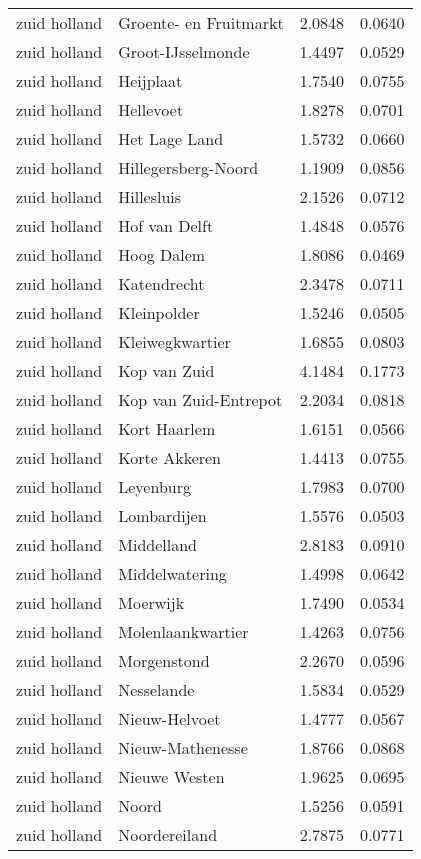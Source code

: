 \begin{longtable}{llcc}
zuid holland & Groente- en Fruitmarkt & 2.0848 & 0.0640 \\
zuid holland & Groot-IJsselmonde & 1.4497 & 0.0529 \\
zuid holland & Heijplaat & 1.7540 & 0.0755 \\
zuid holland & Hellevoet & 1.8278 & 0.0701 \\
zuid holland & Het Lage Land & 1.5732 & 0.0660 \\
zuid holland & Hillegersberg-Noord & 1.1909 & 0.0856 \\
zuid holland & Hillesluis & 2.1526 & 0.0712 \\
zuid holland & Hof van Delft & 1.4848 & 0.0576 \\
zuid holland & Hoog Dalem & 1.8086 & 0.0469 \\
zuid holland & Katendrecht & 2.3478 & 0.0711 \\
zuid holland & Kleinpolder & 1.5246 & 0.0505 \\
zuid holland & Kleiwegkwartier & 1.6855 & 0.0803 \\
zuid holland & Kop van Zuid & 4.1484 & 0.1773 \\
zuid holland & Kop van Zuid-Entrepot & 2.2034 & 0.0818 \\
zuid holland & Kort Haarlem & 1.6151 & 0.0566 \\
zuid holland & Korte Akkeren & 1.4413 & 0.0755 \\
zuid holland & Leyenburg & 1.7983 & 0.0700 \\
zuid holland & Lombardijen & 1.5576 & 0.0503 \\
zuid holland & Middelland & 2.8183 & 0.0910 \\
zuid holland & Middelwatering & 1.4998 & 0.0642 \\
zuid holland & Moerwijk & 1.7490 & 0.0534 \\
zuid holland & Molenlaankwartier & 1.4263 & 0.0756 \\
zuid holland & Morgenstond & 2.2670 & 0.0596 \\
zuid holland & Nesselande & 1.5834 & 0.0529 \\
zuid holland & Nieuw-Helvoet & 1.4777 & 0.0567 \\
zuid holland & Nieuw-Mathenesse & 1.8766 & 0.0868 \\
zuid holland & Nieuwe Westen & 1.9625 & 0.0695 \\
zuid holland & Noord & 1.5256 & 0.0591 \\
zuid holland & Noordereiland & 2.7875 & 0.0771 \\

\end{longtable}
